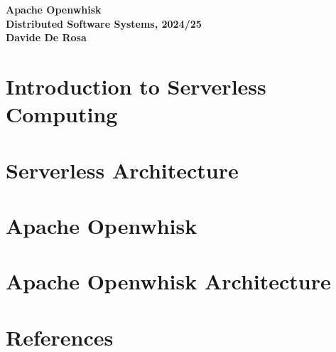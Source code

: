 \documentclass[12pt]{article}
\begin{document}
\begin{center}
\LARGE
\textbf{Apache Openwhisk} \vspace{10pt}\\
\Large
\textbf{Distributed Software Systems, 2024/25} \vspace{10pt}\\
\large
\textbf{Davide De Rosa}
\end{center}

\section{Introduction to Serverless Computing}


\section{Serverless Architecture}


\section{Apache Openwhisk}


\section{Apache Openwhisk Architecture}


\renewcommand{\bibsection}{}
\section*{References}

\end{document}

